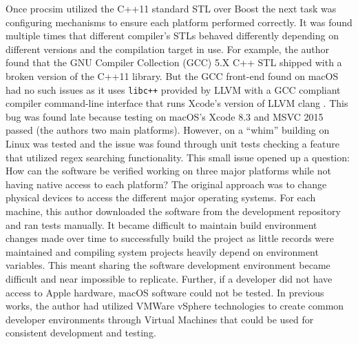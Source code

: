 Once procsim utilized the C++11 standard STL over Boost the next task was configuring mechanisms to ensure each platform performed correctly. It was found multiple times that different compiler's STLs behaved differently depending on different versions and the compilation target in use. For example, the author found that the GNU Compiler Collection (GCC) \cite{GCC} 5.X C++ STL shipped with a broken version of the C++11  library. But the GCC front-end found on macOS had no such issues as it uses \texttt{libc++} provided by LLVM with a GCC compliant compiler command-line interface that runs Xcode's version of LLVM clang \cite{Apple:Developer:CommandLineTools}. This bug was found late because testing on macOS's Xcode 8.3 and MSVC 2015 passed (the authors two main platforms). However, on a ``whim'' building on Linux was tested and the issue was found through unit tests checking a feature that utilized regex searching functionality. This small issue opened up a question: How can the software be verified working on three major platforms while not having native access to each platform? The original approach was to change physical devices to access the different major operating systems. For each machine, this author downloaded the software from the development repository and ran tests manually. It became difficult to maintain build environment changes made over time to successfully build the project as little records were maintained and compiling system projects heavily depend on environment variables. This meant sharing the software development environment became difficult and near impossible to replicate. Further, if a developer did not have access to Apple hardware, macOS software could not be tested. In previous works, the author had utilized VMWare vSphere \cite{VMWare:vSphere} technologies to create common developer environments through Virtual Machines that could be used for consistent development and testing. 

